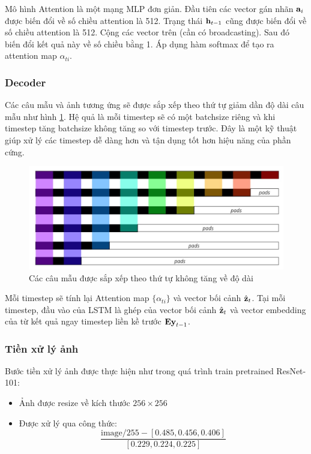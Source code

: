\documentclass[14pt, a4paper]{article}
\numberwithin{equation}{section}
\numberwithin{algorithm}{section}
\numberwithin{figure}{section}
\numberwithin{table}{section}
\numberwithin{dl}{section}
\numberwithin{md}{section}
\numberwithin{bd}{section}
\numberwithin{dn}{section}
\numberwithin{hq}{section}
\begin{document}
    Mô hình Attention là một mạng MLP đơn giản. 
    Đầu tiên các vector gán nhãn $\bold{a}_i$ được biến đổi về số chiều attention là 512.
    Trạng thái $\bold{h}_{t-1}$ cũng được biến đổi về số chiều attention là 512. Cộng các vector trên (cần có broadcasting).
    Sau đó biến đổi kết quả này về số chiều bằng 1. Áp dụng hàm softmax để tạo ra attention map $\alpha_{ti}$.

    \subsubsection{Decoder}

    Các câu mẫu và ảnh tương ứng sẽ được sắp xếp theo thứ tự giảm dần độ dài câu mẫu như hình \ref{fig:Padded_Pack_Sequence}.
    Hệ quả là mỗi timestep sẽ có một batchsize riêng và khi timestep tăng batchsize không tăng so với timestep trước.
    Đây là một kỹ thuật giúp xử lý các timestep dễ dàng hơn và tận dụng tốt hơn hiệu năng của phần cứng.

    \begin{figure}[h!] \centering

        \includegraphics[scale=0.6]{Padded_Pack_Sequence.jpg}
        \caption{Các câu mẫu được sắp xếp theo thứ tự không tăng về độ dài}
        \label{fig:Padded_Pack_Sequence}

    \end{figure}

    Mỗi timestep sẽ tính lại Attention map $\lbrace \alpha_{ti} \rbrace$ và vector bối cảnh $\hat{\bold{z}}_t$. 
    Tại mỗi timestep, đầu vào của LSTM là ghép của vector bối cảnh $\hat{\bold{z}}_t$ và vector embedding của từ kết quả ngay timestep liền kề trước $\bold{Ey}_{t-1}$.

    \subsubsection{Tiền xử lý ảnh}

    Bước tiền xử lý ảnh được thực hiện như trong quá trình train pretrained ResNet-101:
    \begin{itemize}
        \item Ảnh được resize về kích thước $256 \times 256$
        \item Được xử lý qua công thức:
        \begin{equation}
            \dfrac{\mathrm{image}/255-[0.485, 0.456, 0.406]}{[0.229, 0.224, 0.225]}
        \end{equation}
    \end{itemize}
\end{document}
